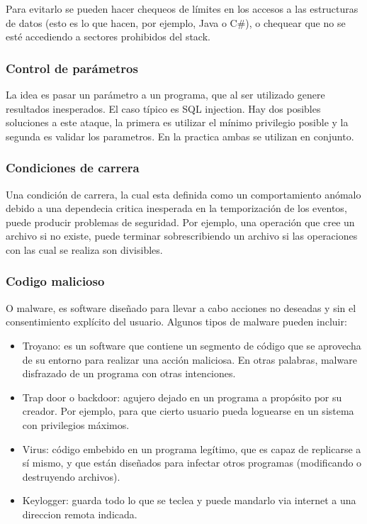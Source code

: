 \documentclass{article}
\begin{document}
Para evitarlo se pueden hacer chequeos de límites en los accesos a las estructuras de datos (esto es lo que hacen, por ejemplo, Java o C\#), o chequear que no se esté accediendo a sectores prohibidos del stack.

\subsubsection{Control de parámetros}

La idea es pasar un parámetro a un programa, que al ser utilizado genere resultados
inesperados. El caso típico es SQL injection. Hay dos posibles soluciones a este ataque, la primera es utilizar el mínimo privilegio posible y la segunda es validar los parametros. En la practica ambas se utilizan en conjunto.


\subsubsection{Condiciones de carrera}


Una condición de carrera, la cual esta definida como un comportamiento anómalo debido a una dependecia critica inesperada en la temporización de los eventos, puede producir problemas de seguridad. Por ejemplo, una operación que cree un archivo si no existe, puede terminar sobrescribiendo un archivo si las operaciones con las cual se realiza son divisibles.

\subsubsection{Codigo malicioso}

O malware, es software diseñado para llevar a cabo acciones no deseadas y sin el consentimiento explícito del usuario. Algunos tipos de malware pueden incluir:
\begin{itemize}
\item Troyano: es un software que contiene un segmento de código que se aprovecha de su entorno para realizar una acción maliciosa. En otras palabras, malware disfrazado de un programa con otras intenciones.
\item Trap door o backdoor: agujero dejado en un programa a propósito por su creador. Por ejemplo, para que cierto usuario pueda loguearse en un sistema con privilegios máximos.
\item Virus: código embebido en un programa legítimo, que es capaz de replicarse a sí mismo, y que están diseñados para infectar otros programas (modificando o destruyendo archivos).
\item Keylogger: guarda todo lo que se teclea y puede mandarlo via internet a una direccion remota indicada.
\end{itemize}
\end{document}
